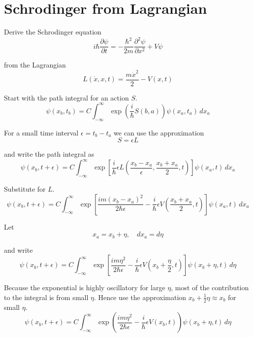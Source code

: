 

\section*{Schrodinger from Lagrangian}

Derive the Schrodinger equation
\begin{equation*}
i\hbar\frac{\partial\psi}{\partial t}=-\frac{\hbar^2}{2m}\frac{\partial^2\psi}{\partial x^2}+V\psi
\end{equation*}

from the Lagrangian
\begin{equation*}
L(\dot x,x,t)=\frac{m\dot x^2}{2}-V(x,t)
\end{equation*}

Start with the path integral for an action $S$.
\begin{equation*}
\psi(x_b,t_b)=C\int_{-\infty}^\infty\exp\left(\frac{i}{\hbar}S(b,a)\right)\psi(x_a,t_a)\,dx_a
\end{equation*}

For a small time interval $\epsilon=t_b-t_a$ we can use the approximation
\begin{equation*}
S=\epsilon L
\end{equation*}

and write the path integral as
\begin{equation*}
\psi(x_b,t+\epsilon)=C\int_{-\infty}^\infty
\exp\left[\frac{i}{\hbar}\epsilon L\left(\frac{x_b-x_a}{\epsilon},\frac{x_b+x_a}{2},t\right)\right]
\psi(x_a,t)\,dx_a
\end{equation*}

Substitute for $L$.
\begin{equation*}
\psi(x_b,t+\epsilon)=C\int_{-\infty}^\infty
\exp\left[\frac{im(x_b-x_a)^2}{2\hbar\epsilon}
-\frac{i}{\hbar}\epsilon V\left(\frac{x_b+x_a}{2},t\right)\right]\psi(x_a,t)\,dx_a
\end{equation*}

Let
\begin{equation*}
x_a=x_b+\eta,\quad dx_a=d\eta
\end{equation*}

and write
\begin{equation*}
\psi(x_b,t+\epsilon)=C\int_{-\infty}^\infty
\exp\left[\frac{im\eta^2}{2\hbar\epsilon}
-\frac{i}{\hbar}\epsilon V\left(x_b+\frac{\eta}{2},t\right)\right]\psi(x_b+\eta,t)\,d\eta
\end{equation*}

Because the exponential is highly oscillatory for large $\eta$,
most of the contribution to the integral is from small $\eta$.
Hence use the approximation $x_b+\tfrac{1}{2}\eta\approx x_b$ for small $\eta$.
\begin{equation*}
\psi(x_b,t+\epsilon)=C\int_{-\infty}^\infty
\exp\left(\frac{im\eta^2}{2\hbar\epsilon}
-\frac{i}{\hbar}\epsilon V(x_b,t)\right)\psi(x_b+\eta,t)\,d\eta
\end{equation*}

